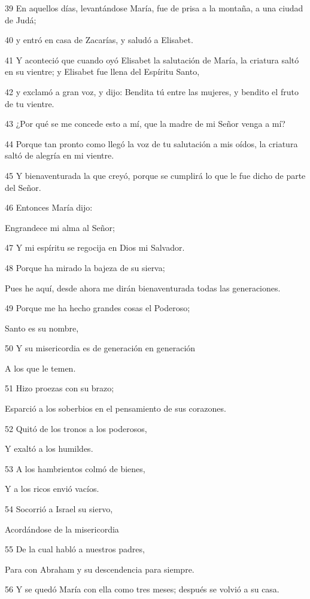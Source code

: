 \par 39 En aquellos días, levantándose María, fue de prisa a la montaña, a una ciudad de Judá;
\par 40 y entró en casa de Zacarías, y saludó a Elisabet.
\par 41 Y aconteció que cuando oyó Elisabet la salutación de María, la criatura saltó en su vientre; y Elisabet fue llena del Espíritu Santo,
\par 42 y exclamó a gran voz, y dijo: Bendita tú entre las mujeres, y bendito el fruto de tu vientre.
\par 43 ¿Por qué se me concede esto a mí, que la madre de mi Señor venga a mí?
\par 44 Porque tan pronto como llegó la voz de tu salutación a mis oídos, la criatura saltó de alegría en mi vientre.
\par 45 Y bienaventurada la que creyó, porque se cumplirá lo que le fue dicho de parte del Señor.
\par 46 Entonces María dijo:
\par Engrandece mi alma al Señor;
\par 47 Y mi espíritu se regocija en Dios mi Salvador.
\par 48 Porque ha mirado la bajeza de su sierva;
\par Pues he aquí, desde ahora me dirán bienaventurada todas las generaciones.
\par 49 Porque me ha hecho grandes cosas el Poderoso;
\par Santo es su nombre,
\par 50 Y su misericordia es de generación en generación
\par A los que le temen.
\par 51 Hizo proezas con su brazo;
\par Esparció a los soberbios en el pensamiento de sus corazones.
\par 52 Quitó de los tronos a los poderosos,
\par Y exaltó a los humildes.
\par 53 A los hambrientos colmó de bienes,
\par Y a los ricos envió vacíos.
\par 54 Socorrió a Israel su siervo,
\par Acordándose de la misericordia
\par 55 De la cual habló a nuestros padres,
\par Para con Abraham y su descendencia para siempre.
\par 56 Y se quedó María con ella como tres meses; después se volvió a su casa.

